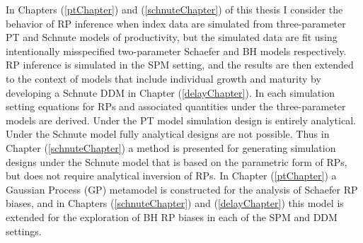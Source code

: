 \documentclass[12pt]{ucscthesis}
\begin{document}
In Chapters (\ref{ptChapter}) and (\ref{schnuteChapter}) of this thesis I 
consider the behavior of RP inference when index data are simulated from three-parameter 
PT and Schnute models of productivity, but the simulated data are fit using 
intentionally misspecified two-parameter Schaefer and BH models respectively. 
%
RP inference is simulated in the SPM setting, and the 
results are then extended to the context of models that include individual 
growth and maturity by developing a Schnute DDM in Chapter (\ref{delayChapter}).
%
In each simulation setting equations for RPs and associated quantities 
under the three-parameter models are derived. %
Under the PT model simulation design is entirely analytical. Under the 
Schnute model fully analytical designs are not possible. Thus %
in Chapter (\ref{schnuteChapter}) a method is presented for generating simulation designs under the Schnute model 
that is based on the parametric form of RPs, but does not 
require analytical inversion of RPs. %
In Chapter (\ref{ptChapter}) a Gaussian Process (GP) metamodel \cite{gramacy_surrogates_2020, pourmohamad_bayesian_2021} 
is constructed for the analysis of Schaefer RP biases, and in Chapters (\ref{schnuteChapter}) 
and (\ref{delayChapter}) this model is extended for the exploration %
of BH RP biases in each of the SPM and DDM settings. %
\end{document}
